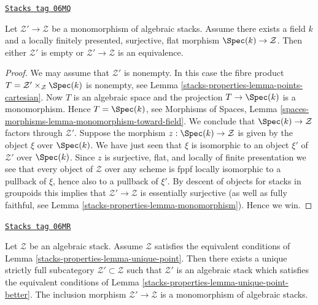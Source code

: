 \begin{lemma}
\label{stacks-properties-lemma-monomorphism-into-point}
\href{https://stacks.math.columbia.edu/tag/06MQ}{\texttt{Stacks tag 06MQ}}

Let $\mathcal{Z}' \to \mathcal{Z}$ be a monomorphism of algebraic stacks.
Assume there exists a field $k$ and a locally finitely presented, surjective,
flat morphism $\Spec(k) \to \mathcal{Z}$. Then either $\mathcal{Z}'$
is empty or $\mathcal{Z}' \to \mathcal{Z}$ is an equivalence.
\end{lemma}

\begin{proof}
We may assume that $\mathcal{Z}'$ is nonempty. In this case the
fibre product $T = \mathcal{Z}' \times_\mathcal{Z} \Spec(k)$
is nonempty, see
Lemma \ref{stacks-properties-lemma-points-cartesian}.
Now $T$ is an algebraic space and the projection $T \to \Spec(k)$
is a monomorphism. Hence $T = \Spec(k)$, see
Morphisms of Spaces, Lemma
\ref{spaces-morphisms-lemma-monomorphism-toward-field}.
We conclude that $\Spec(k) \to \mathcal{Z}$ factors through
$\mathcal{Z}'$. Suppose the morphism $z : \Spec(k) \to \mathcal{Z}$
is given by the object $\xi$ over $\Spec(k)$. We have just seen that
$\xi$ is isomorphic to an object $\xi'$ of $\mathcal{Z}'$ over
$\Spec(k)$. Since $z$
is surjective, flat, and locally of finite presentation we see that
every object of $\mathcal{Z}$ over any scheme is fppf locally isomorphic
to a pullback of $\xi$, hence also to a pullback of $\xi'$. By descent of
objects for stacks in groupoids this implies that
$\mathcal{Z}' \to \mathcal{Z}$ is essentially surjective (as well as
fully faithful, see
Lemma \ref{stacks-properties-lemma-monomorphism}).
Hence we win.
\end{proof}

\begin{lemma}
\label{stacks-properties-lemma-improve-unique-point}
\href{https://stacks.math.columbia.edu/tag/06MR}{\texttt{Stacks tag 06MR}}

Let $\mathcal{Z}$ be an algebraic stack. Assume $\mathcal{Z}$ satisfies
the equivalent conditions of
Lemma \ref{stacks-properties-lemma-unique-point}.
Then there exists a unique strictly full subcategory
$\mathcal{Z}' \subset \mathcal{Z}$ such that
$\mathcal{Z}'$ is an algebraic stack which satisfies the equivalent
conditions of
Lemma \ref{stacks-properties-lemma-unique-point-better}.
The inclusion morphism $\mathcal{Z}' \to \mathcal{Z}$ is a monomorphism
of algebraic stacks.
\end{lemma}

